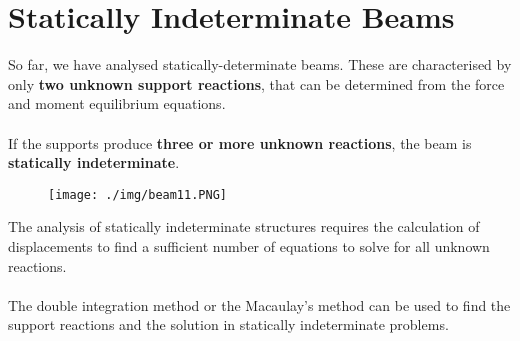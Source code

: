 \section{Statically Indeterminate Beams}
So far, we have analysed statically-determinate beams. These are characterised by only \textbf{two unknown support reactions}, that can be determined from the force and moment equilibrium equations. \\\\
If the supports produce \textbf{three or more unknown reactions}, the beam is \textbf{statically indeterminate}.
\begin{figure}[H]
  \centering
  \texttt{[image: ./img/beam11.PNG]}
\end{figure}
The analysis of statically indeterminate structures requires the calculation of displacements to find a sufficient number of equations to solve for all unknown reactions. \\\\
The double integration method or the Macaulay’s method can be used to find the support reactions and the solution in statically indeterminate problems.
